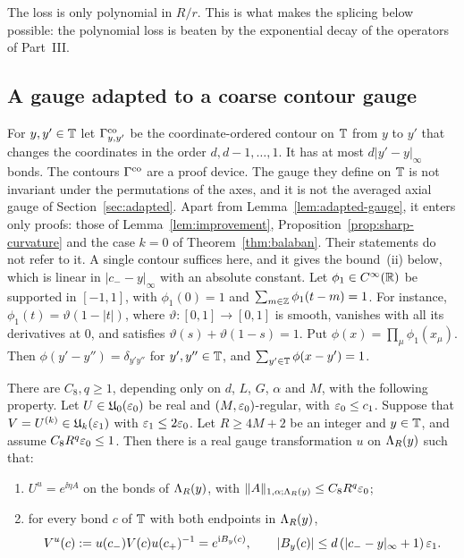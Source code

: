 The loss is only polynomial in $R/r$. This is what makes the splicing below possible: the polynomial loss is beaten by the exponential decay of the operators of Part~III.

\subsection{A gauge adapted to a coarse contour gauge}\label{ss:28.3}

For $y,y'\in\mathbb T$ let $\Gamma^{\rm co}_{y,y'}$ be the coordinate-ordered contour on $\mathbb T$ from $y$ to $y'$ that changes the coordinates in the order $d,d-1,\dots,1$. It has at most $d|y'-y|_\infty$ bonds. The contours $\Gamma^{\rm co}$ are a proof device. The gauge they define on $\mathbb T$ is not invariant under the permutations of the axes, and it is not the averaged axial gauge of Section~\ref{sec:adapted}. Apart from Lemma~\ref{lem:adapted-gauge}, it enters only proofs: those of Lemma~\ref{lem:improvement}, Proposition~\ref{prop:sharp-curvature} and the case $k=0$ of Theorem~\ref{thm:balaban}. Their statements do not refer to it. A single contour suffices here, and it gives the bound~(ii) below, which is linear in $|c_--y|_\infty$ with an absolute constant. Let $\phi_1\in C^\infty(\mathbb R)$ be supported in $[-1,1]$, with $\phi_1(0)=1$ and $\sum_{m\in\mathbb Z}\phi_1(t-m)=1$. For instance, $\phi_1(t)=\vartheta(1-|t|)$, where $\vartheta:[0,1]\to[0,1]$ is smooth, vanishes with all its derivatives at $0$, and satisfies $\vartheta(s)+\vartheta(1-s)=1$. Put $\phi(x)=\prod_\mu\phi_1(x_\mu)$. Then $\phi(y'-y'')=\delta_{y'y''}$ for $y',y''\in\mathbb T$, and $\sum_{y'\in\mathbb T}\phi(x-y')=1$.

\begin{lemma}\label{lem:adapted-gauge}
There are $C_8,q\ge1$, depending only on $d$, $L$, $G$, $\alpha$ and $M$, with the following property. Let $U\in\mathfrak U_0(\varepsilon_0)$ be real and $(M,\varepsilon_0)$-regular, with $\varepsilon_0\le c_1$. Suppose that $V=U^{(k)}\in\mathfrak U_k(\varepsilon_1)$ with $\varepsilon_1\le2\varepsilon_0$. Let $R\ge4M+2$ be an integer and $y\in\mathbb T$, and assume $C_8R^q\varepsilon_0\le1$. Then there is a real gauge transformation $u$ on $\Lambda_R(y)$ such that:
\begin{enumerate}[label=(\roman*)]
\item $U^u=e^{\ii\eta A}$ on the bonds of $\Lambda_R(y)$, with $\|A\|_{1,\alpha;\Lambda_R(y)}\le C_8R^q\varepsilon_0$;
\item for every bond $c$ of $\mathbb T$ with both endpoints in $\Lambda_R(y)$,
\[
V^u(c):=u(c_-)V(c)u(c_+)^{-1}=e^{\mathrm i B_y(c)},\qquad|B_y(c)|\le d\,(|c_--y|_\infty+1)\,\varepsilon_1 .
\]
\end{enumerate}
\end{lemma}


